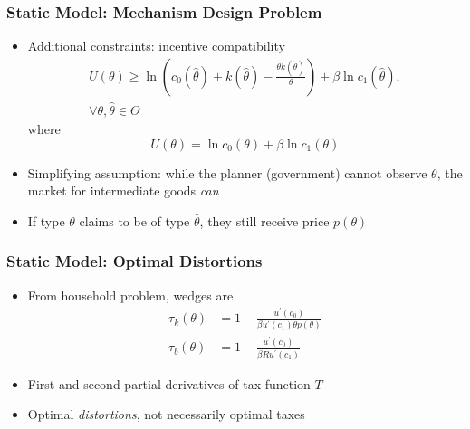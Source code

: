 \documentclass{beamer}
\begin{document}
\begin{frame}
    \frametitle{Static Model: Mechanism Design Problem}

    \begin{itemize}
        \item Additional constraints: incentive compatibility
        \begin{multline*}
            U\left(\theta\right)\ge\ln\left(c_{0}\left(\hat{\theta}\right)+k\left(\hat{\theta}\right)-\frac{\hat{\theta}k\left(\hat{\theta}\right)}{\theta}\right)+\beta\ln c_{1}\left(\hat{\theta}\right), \\  \forall\theta,\hat{\theta}\in\Theta
        \end{multline*}
        where 
        \begin{equation*}
            U\left(\theta\right)=\ln c_{0}\left(\theta\right)+\beta\ln c_{1}\left(\theta\right)
        \end{equation*} 
        \item Simplifying assumption: while the planner (government) cannot observe \( \theta \), the market for intermediate goods \textit{can}
        \item If type \( \theta \) claims to be of type \( \hat{\theta} \), they still receive price \( p\left( \theta \right) \)
    \end{itemize}

\end{frame}

\begin{frame}
    \frametitle{Static Model: Optimal Distortions}
    
    \begin{itemize}
        \item From household problem, wedges are 
        \begin{align*}
            \tau_k(\theta) &= 1-\frac{u^{\prime}\left(c_{0}\right)}{\beta u^{\prime}\left(c_{1}\right)\theta p\left(\theta\right)} \label{eq:static_tk} \\
            \tau_b(\theta) &= 1-\frac{u^{\prime}\left(c_{0}\right)}{\beta Ru^{\prime}\left(c_{1}\right)}
        \end{align*} 
        \item First and second partial derivatives of tax function \( T \) 
        \item Optimal \textit{distortions}, not necessarily optimal taxes
    \end{itemize}
    
\end{frame}
\end{document}
